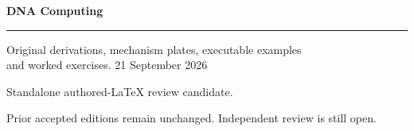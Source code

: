 \documentclass[11pt,oneside,openany]{book}
\begin{document}
\frontmatter
\begin{titlepage}
\color{Blue}\sffamily\vspace*{20mm}
{\Huge\bfseries DNA Computing\par}
\vspace{10mm}{\LARGE Chapter 10\par}
\vspace{8mm}{\Large Separation, readout, and measurement\par}
\vspace{12mm}\rule{\linewidth}{.8pt}
\vspace{6mm}\par Original derivations, mechanism plates, executable examples\\and worked exercises.
\vfill 21 September 2026\par
Standalone authored-LaTeX review candidate.\par
Prior accepted editions remain unchanged. Independent review is still open.
\end{titlepage}
\tableofcontents
\mainmatter
\setcounter{chapter}{9}

\backmatter

\clearpage{}
\printindex
\end{document}
